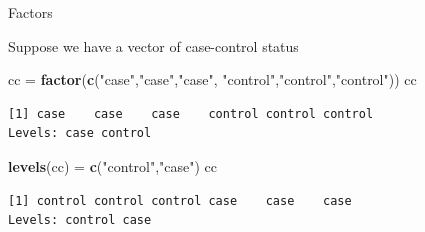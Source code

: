 \documentclass[
  ignorenonframetext,
]{beamer}
\newenvironment{Shaded}{\begin{snugshade}}{\end{snugshade}}
\newcommand{\KeywordTok}[1]{\textcolor[rgb]{0.13,0.29,0.53}{\textbf{#1}}}
\newcommand{\NormalTok}[1]{#1}
\newcommand{\StringTok}[1]{\textcolor[rgb]{0.31,0.60,0.02}{#1}}
\begin{document}
\begin{frame}[fragile]{Factors}
\protect\hypertarget{factors-2}{}

Suppose we have a vector of case-control status

\begin{Shaded}
\begin{Highlighting}[]
\NormalTok{cc =}\StringTok{ }\KeywordTok{factor}\NormalTok{(}\KeywordTok{c}\NormalTok{(}\StringTok{"case"}\NormalTok{,}\StringTok{"case"}\NormalTok{,}\StringTok{"case"}\NormalTok{,}
        \StringTok{"control"}\NormalTok{,}\StringTok{"control"}\NormalTok{,}\StringTok{"control"}\NormalTok{))}
\NormalTok{cc}
\end{Highlighting}
\end{Shaded}

\begin{verbatim}
[1] case    case    case    control control control
Levels: case control
\end{verbatim}

\begin{Shaded}
\begin{Highlighting}[]
\KeywordTok{levels}\NormalTok{(cc) =}\StringTok{ }\KeywordTok{c}\NormalTok{(}\StringTok{"control"}\NormalTok{,}\StringTok{"case"}\NormalTok{)}
\NormalTok{cc}
\end{Highlighting}
\end{Shaded}

\begin{verbatim}
[1] control control control case    case    case   
Levels: control case
\end{verbatim}

\end{frame}
\end{document}
